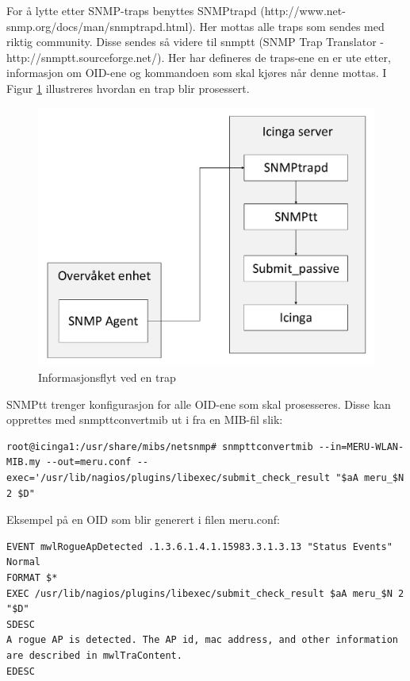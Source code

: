For å lytte etter SNMP-traps benyttes SNMPtrapd (http://www.net-snmp.org/docs/man/snmptrapd.html). Her mottas alle traps som sendes med riktig community. Disse sendes så videre til snmptt (SNMP Trap Translator - http://snmptt.sourceforge.net/). Her har defineres de traps-ene en er ute etter, informasjon om OID-ene og kommandoen som skal kjøres når denne mottas. I Figur \ref{snmptrap} illustreres hvordan en trap blir prosessert. 

\begin{figure}
    \centering
    \includegraphics[scale=0.6]{img/SNMPtrap}
    \caption{Informasjonsflyt ved en trap}
    \label{snmptrap}
\end{figure}

SNMPtt trenger konfigurasjon for alle OID-ene som skal prosesseres. Disse kan opprettes med snmpttconvertmib ut i fra en MIB-fil slik:

\begin{lstlisting}
root@icinga1:/usr/share/mibs/netsnmp# snmpttconvertmib --in=MERU-WLAN-MIB.my --out=meru.conf --exec='/usr/lib/nagios/plugins/libexec/submit_check_result "$aA meru_$N 2 $D"
\end{lstlisting}

Eksempel på en OID som blir generert i filen meru.conf:

\begin{lstlisting}
EVENT mwlRogueApDetected .1.3.6.1.4.1.15983.3.1.3.13 "Status Events" Normal
FORMAT $*
EXEC /usr/lib/nagios/plugins/libexec/submit_check_result $aA meru_$N 2 "$D"
SDESC
A rogue AP is detected. The AP id, mac address, and other information are described in mwlTraContent.
EDESC
\end{lstlisting}

